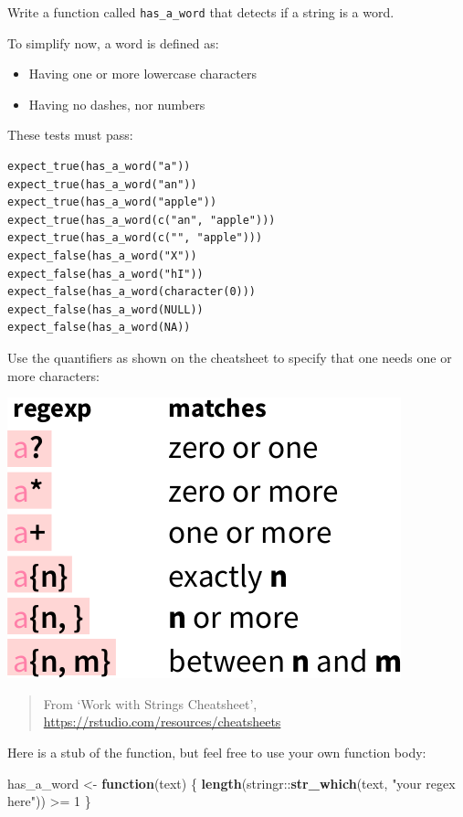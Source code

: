 \documentclass[]{book}
\newenvironment{Shaded}{}{}
\newcommand{\ControlFlowTok}[1]{\textcolor[rgb]{0.00,0.44,0.13}{\textbf{#1}}}
\newcommand{\DecValTok}[1]{\textcolor[rgb]{0.25,0.63,0.44}{#1}}
\newcommand{\KeywordTok}[1]{\textcolor[rgb]{0.00,0.44,0.13}{\textbf{#1}}}
\newcommand{\NormalTok}[1]{#1}
\newcommand{\OperatorTok}[1]{\textcolor[rgb]{0.40,0.40,0.40}{#1}}
\newcommand{\StringTok}[1]{\textcolor[rgb]{0.25,0.44,0.63}{#1}}
\providecommand{\tightlist}{%
  \setlength{\itemsep}{0pt}\setlength{\parskip}{0pt}}
\begin{document}
Write a function called \texttt{has\_a\_word} that detects if a string is a word.

To simplify now, a word is defined as:

\begin{itemize}
\tightlist
\item
  Having one or more lowercase characters
\item
  Having no dashes, nor numbers
\end{itemize}

These tests must pass:

\begin{verbatim}
expect_true(has_a_word("a"))
expect_true(has_a_word("an"))
expect_true(has_a_word("apple"))
expect_true(has_a_word(c("an", "apple")))
expect_true(has_a_word(c("", "apple")))
expect_false(has_a_word("X"))
expect_false(has_a_word("hI"))
expect_false(has_a_word(character(0)))
expect_false(has_a_word(NULL))
expect_false(has_a_word(NA))
\end{verbatim}

Use the quantifiers as shown on the cheatsheet to specify that one needs
one or more characters:

\includegraphics{data/06_quantifiers.png}

\begin{quote}
From `Work with Strings Cheatsheet', \url{https://rstudio.com/resources/cheatsheets}
\end{quote}

Here is a stub of the function, but feel free to use your own function body:

\begin{Shaded}
\begin{Highlighting}[]
\NormalTok{has_a_word <-}\StringTok{ }\ControlFlowTok{function}\NormalTok{(text) \{}
  \KeywordTok{length}\NormalTok{(stringr}\OperatorTok{::}\KeywordTok{str_which}\NormalTok{(text, }\StringTok{"your regex here"}\NormalTok{)) }\OperatorTok{>=}\StringTok{ }\DecValTok{1}
\NormalTok{\}}
\end{Highlighting}
\end{Shaded}
\end{document}
